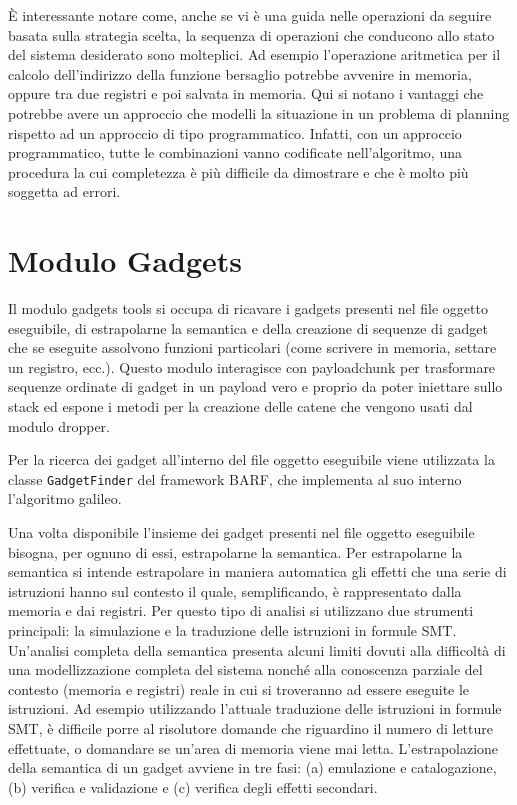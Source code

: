 È interessante notare come, anche se vi è una guida nelle operazioni
da seguire basata sulla strategia scelta, la sequenza di operazioni
che conducono allo stato del sistema desiderato sono molteplici. Ad
esempio l'operazione aritmetica per il calcolo dell'indirizzo della
funzione bersaglio potrebbe avvenire in memoria, oppure tra due
registri e poi salvata in memoria. Qui si notano i vantaggi che
potrebbe avere un approccio che modelli la situazione in un problema
di planning rispetto ad un approccio di tipo programmatico. Infatti,
con un approccio programmatico, tutte le combinazioni vanno codificate
nell'algoritmo, una procedura la cui completezza è più difficile da
dimostrare e che è molto più soggetta ad errori.

\section{Modulo Gadgets}

Il modulo gadgets tools si occupa di ricavare i gadgets presenti nel
file oggetto eseguibile, di estrapolarne la semantica e della
creazione di sequenze di gadget che se eseguite assolvono funzioni
particolari (come scrivere in memoria, settare un registro,
ecc.). Questo modulo interagisce con payloadchunk per trasformare
sequenze ordinate di gadget in un payload vero e proprio da poter
iniettare sullo stack ed espone i metodi per la creazione delle catene
che vengono usati dal modulo dropper.

Per la ricerca dei gadget all'interno del file oggetto eseguibile
viene utilizzata la classe \lstinline{GadgetFinder} del framework
BARF, che implementa al suo interno l'algoritmo galileo\cite{roemer-12}. 


Una volta disponibile l'insieme dei gadget presenti nel file oggetto
eseguibile bisogna, per ognuno di essi, estrapolarne la semantica. Per
estrapolarne la semantica si intende estrapolare in maniera automatica
gli effetti che una serie di istruzioni hanno sul contesto il quale,
semplificando, è rappresentato dalla memoria e dai registri. Per
questo tipo di analisi si utilizzano due strumenti principali: la
simulazione e la traduzione delle istruzioni in formule
SMT. Un'analisi completa della semantica presenta alcuni limiti dovuti
alla difficoltà di una modellizzazione completa del sistema nonché
alla conoscenza parziale del contesto (memoria e registri) reale in
cui si troveranno ad essere eseguite le istruzioni. Ad esempio
utilizzando l'attuale traduzione delle istruzioni in formule SMT, è
difficile porre al risolutore domande che riguardino il numero di
letture effettuate, o domandare se un'area di memoria viene mai
letta. L'estrapolazione della semantica di un gadget avviene in tre
fasi: (a) emulazione e catalogazione, (b) verifica e validazione e
(c) verifica degli effetti secondari.

